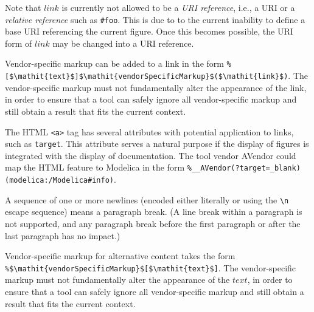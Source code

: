 \begin{nonnormative}
Note that $\mathit{link}$ is currently not allowed to be a \emph{URI reference}, i.e., a URI or a \emph{relative reference} such as \lstinline!#foo!.
This is due to to the current inability to define a base URI referencing the current figure.
Once this becomes possible, the URI form of $\mathit{link}$ may be changed into a URI reference.
\end{nonnormative}

Vendor-specific markup can be added to a link in the form \lstinline!%[$\mathit{text}$]$\mathit{vendorSpecificMarkup}$($\mathit{link}$)!.
The vendor-specific markup must not fundamentally alter the appearance of the link, in order to ensure that a tool can safely ignore all vendor-specific markup and still obtain a result that fits the current context.

\begin{example}
The HTML \lstinline!<a>! tag has several attributes with potential application to links, such as \lstinline!target!.
This attribute serves a natural purpose if the display of figures is integrated with the display of documentation.
The tool vendor AVendor could map the HTML feature to Modelica in the form \lstinline!%__AVendor(?target=_blank)(modelica:/Modelica#info)!.
\end{example}

A sequence of one or more newlines (encoded either literally or using the \lstinline!\n! escape sequence) means a paragraph break.
(A line break within a paragraph is not supported, and any paragraph break before the first paragraph or after the last paragraph has no impact.)

Vendor-specific markup for alternative content takes the form \lstinline!%$\mathit{vendorSpecificMarkup}$[$\mathit{text}$]!.
The vendor-specific markup must not fundamentally alter the appearance of the $\mathit{text}$, in order to ensure that a tool can safely ignore all vendor-specific markup and still obtain a result that fits the current context.


